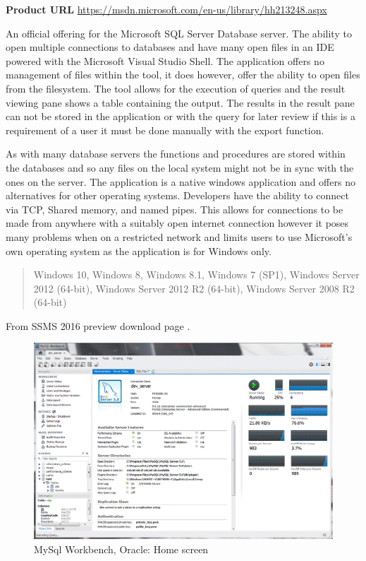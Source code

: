 \noindent

\textbf{Product URL}\cite{ssms}
\url{https://msdn.microsoft.com/en-us/library/hh213248.aspx}



An official offering for the Microsoft SQL Server Database server. The ability
to open multiple connections to databases and have many open files in an IDE
powered with the Microsoft Visual Studio Shell\cite{vsshell}. The application
offers no management of files within the tool, it does however, offer the
ability to open files from the filesystem. The tool allows for the execution of queries and the result viewing pane shows a table containing the output. The results in the result pane can not be stored in the application or with the query for later review if this is a requirement of a user it must be done manually with the export function.

As with many database servers the functions and procedures are stored within the
databases and so any files on the local system might not be in sync with the
ones on the server. The application is a native windows application and offers
no alternatives for other operating systems. Developers have the ability to
connect via TCP, Shared memory, and named pipes. This allows for connections to be made from anywhere with a suitably open internet connection however it poses many problems when on a restricted network and limits users to use Microsoft's
own operating system as the application is for Windows only.

\blockquote{Windows 10, Windows 8, Windows 8.1, Windows 7 (SP1), Windows Server 2012 (64-bit), Windows Server 2012 R2 (64-bit), Windows Server 2008 R2 (64-bit)}

From SSMS 2016 preview download page \cite{ssmsdownload}.


\begin{figure}
  \includegraphics[width=\linewidth]{Figures/MySqlWorkbench.png}
  \caption{MySql Workbench, Oracle: Home screen}
  \label{fig:mysqlworkbench}
\end{figure}

